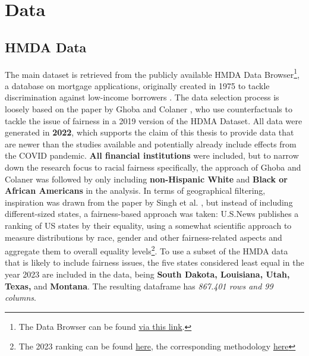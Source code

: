 \section{Data}\label{sec:Data}

\subsection{HMDA Data}\label{subsec:HMDA_Data}

The main dataset is retrieved from the publicly available HMDA Data Browser\footnote{The Data Browser can be found \href{https://ffiec.cfpb.gov/data-browser/data/2022?category=states}{via this link}.}, a database on mortgage applications, originally created in 1975 to tackle discrimination against low-income borrowers \parencite{Bogen2020}. 
The data selection process is loosely based on the paper by Ghoba and Colaner \parencite{Ghoba}, who use counterfactuals to tackle the issue of fairness in a 2019 version of the HDMA Dataset. 
All data were generated in \textbf{2022}, which supports the claim of this thesis to provide data that are newer than the studies available and potentially already include effects from the COVID pandemic. \textbf{All financial institutions} were included, but to narrow down the research focus to racial fairness specifically, the approach of Ghoba and Colaner was followed by only including \textbf{non-Hispanic White} and \textbf{Black or African Americans} in the analysis. 
In terms of geographical filtering, inspiration was drawn from the paper by Singh et al. \parencite{Singh2022}, but instead of including different-sized states, a fairness-based approach was taken: 
U.S.News publishes a ranking of US states by their equality, using a somewhat scientific approach to measure distributions by race, gender and other fairness-related aspects and aggregate them to overall equality levels\footnote{The 2023 ranking can be found \href{https://www.usnews.com/news/best-states/rankings/opportunity/equality?sort=rank-desc}{here}, the corresponding methodology \href{https://www.usnews.com/news/best-states/articles/methodology}{here}}. 
To use a subset of the HMDA data that is likely to include fairness issues, the five states considered least equal in the year 2023 are included in the data, being \textbf{South Dakota, Louisiana, Utah, Texas,} and \textbf{Montana}. The resulting dataframe has \textit{867.401 rows and 99 columns}.


